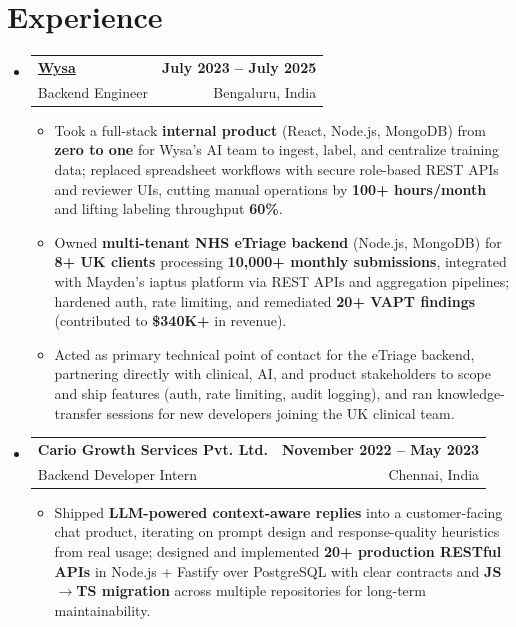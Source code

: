 \documentclass[letterpaper,10pt]{article}
\makeatletter
\newcommand{\resumeItem}[1]{
  \item\small{#1\vspace{-1pt}}
}
\newcommand{\resumeSubheading}[4]{
  \vspace{1pt}\item
    \begin{tabular*}{0.985\textwidth}[t]{l@{\extracolsep{\fill}}r}
      \textbf{#1} & \textbf{\small #2} \\
      {\small\color{ResumeSlate} #3} & {\small\color{ResumeSlate} #4} \\
    \end{tabular*}\vspace{-6pt}
}
\newcommand{\resumeSubHeadingListStart}{\begin{itemize}[leftmargin=0.0in, label={}, itemsep=2pt, topsep=2pt]}
\newcommand{\resumeSubHeadingListEnd}{\end{itemize}}
\newcommand{\resumeItemListStart}{\begin{itemize}[leftmargin=0.18in, itemsep=2pt, topsep=1pt]}
\newcommand{\resumeItemListEnd}{\end{itemize}\vspace{-4pt}}
\makeatother
\begin{document}
\section{Experience}
\resumeSubHeadingListStart
  \resumeSubheading
    {\href{https://www.wysa.io}{Wysa}}{July 2023 -- July 2025}
    {Backend Engineer}{Bengaluru, India}
    \resumeItemListStart
      \resumeItem{Took a full-stack \textbf{internal product} (React, Node.js, MongoDB) from \textbf{zero to one} for Wysa's AI team to ingest, label, and centralize training data; replaced spreadsheet workflows with secure role-based REST APIs and reviewer UIs, cutting manual operations by \textbf{100+ hours/month} and lifting labeling throughput \textbf{60\%}.}
      \resumeItem{Owned \textbf{multi-tenant NHS eTriage backend} (Node.js, MongoDB) for \textbf{8+ UK clients} processing \textbf{10{,}000+ monthly submissions}, integrated with Mayden's iaptus platform via REST APIs and aggregation pipelines; hardened auth, rate limiting, and remediated \textbf{20+ VAPT findings} (contributed to \textbf{\$340K+} in revenue).}
      \resumeItem{Acted as primary technical point of contact for the eTriage backend, partnering directly with clinical, AI, and product stakeholders to scope and ship features (auth, rate limiting, audit logging), and ran knowledge-transfer sessions for new developers joining the UK clinical team.}
    \resumeItemListEnd
  \resumeSubheading
    {Cario Growth Services Pvt. Ltd.}{November 2022 -- May 2023}
    {Backend Developer Intern}{Chennai, India}
    \resumeItemListStart
      \resumeItem{Shipped \textbf{LLM-powered context-aware replies} into a customer-facing chat product, iterating on prompt design and response-quality heuristics from real usage; designed and implemented \textbf{20+ production RESTful APIs} in Node.js + Fastify over PostgreSQL with clear contracts and \textbf{JS\(\rightarrow\)TS migration} across multiple repositories for long-term maintainability.}
    \resumeItemListEnd
\resumeSubHeadingListEnd
\vspace{-4pt}
\end{document}
